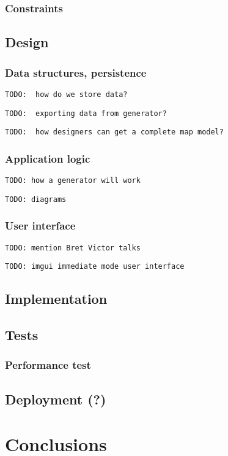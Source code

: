 \documentclass[12pt]{report}
\newcommand{\todo}[1]{}
\renewcommand{\todo}[1]{{\color{red} \par \noindent \footnotesize \texttt{TODO: {#1} }}}
\begin{document}
\subsection{Constraints}


\section{Design}
\subsection{Data structures, persistence}
 
\todo{ how do we store data?}
\todo{ exporting data from generator? }
\todo{ how designers can get a complete map model? } 
 
\subsection{Application logic} 

\todo{how a generator will work}
\todo{diagrams}

\subsection{User interface}

\todo{mention Bret Victor talks}
\todo{imgui immediate mode user interface}

\section{Implementation}



\section{Tests} 

\subsection{Performance test}

\section{Deployment (?)} 

\chapter{Conclusions} \label{rozdzial.podsumowanie}
\end{document}
